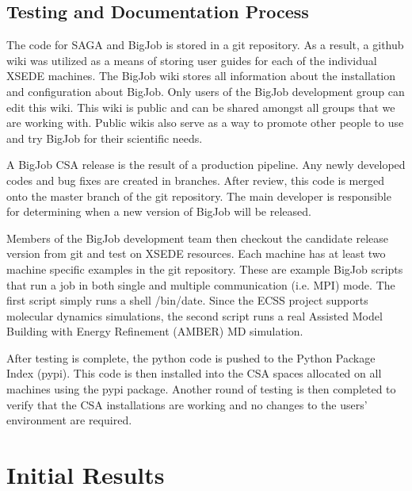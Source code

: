 \documentclass{sig-alternate}
\begin{document}


\subsection{Testing and Documentation Process}

The code for SAGA and BigJob is stored in a git repository. As a result, a github wiki was utilized as a means of storing user guides for each of the individual XSEDE machines. The BigJob wiki stores all information about the installation and configuration about BigJob. Only users of the BigJob development group can edit this wiki. This wiki is public and can be shared amongst all groups that we are working with. Public wikis also serve as a way to promote other people to use and try BigJob for their scientific needs.

A BigJob CSA release is the result of a production pipeline. Any newly developed codes and bug fixes are created in branches. After review, this code is merged onto the master branch of the git repository. The main developer is responsible for determining when a new version of BigJob will be released. 

Members of the BigJob development team then checkout the candidate release version from git and test on XSEDE resources. Each machine has at least two machine specific examples in the git repository. These are example BigJob scripts that run a job in both single and multiple communication (i.e. MPI) mode. The first script simply runs a shell /bin/date. Since the ECSS project supports molecular dynamics simulations, the second script runs a real Assisted Model Building with Energy Refinement (AMBER) MD simulation. 

After testing is complete, the python code is pushed to the Python Package Index (pypi). This code is then installed into the CSA spaces allocated on all machines using the pypi package. Another round of testing is then completed to verify that the CSA installations are working and no changes to the users' environment are required.


\section{Initial Results} 
\end{document}
